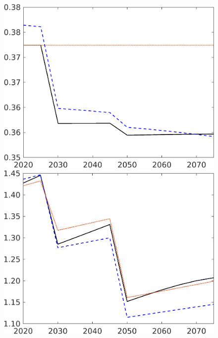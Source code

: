\begin{figure}[h!!]
\begin{minipage}[]{0.32\textwidth}
\end{minipage}
	\begin{minipage}[]{0.32\textwidth}
		\includegraphics[width=1\textwidth]{../../codding_model/own_basedOnFried/optimalPol_elastS_DisuSci/figures/all_1705/hh_CompEffOPT_T_NoTaus_spillover0_noskill1_sep1_BN0_ineq0_red0_etaa0.79_lgd0.png}
	\end{minipage}
	\begin{minipage}[]{0.32\textwidth}
		\includegraphics[width=1\textwidth]{../../codding_model/own_basedOnFried/optimalPol_elastS_DisuSci/figures/all_1705/C_CompEffOPT_T_NoTaus_spillover0_noskill1_sep1_BN0_ineq0_red0_etaa0.79_lgd0.png}

\end{minipage}
\end{figure}
